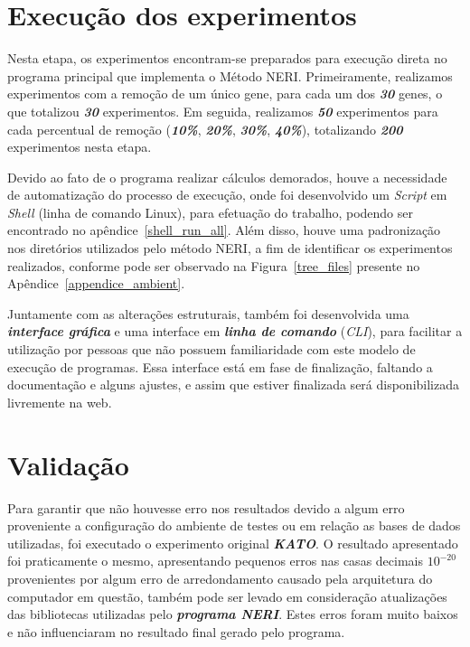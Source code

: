 \section{Execução dos experimentos}

%
% 
Nesta etapa, os experimentos encontram-se preparados para execução direta no programa principal que implementa o Método NERI.
%
Primeiramente, realizamos experimentos com a remoção de um único gene, para cada um dos \textsl{\textbf{30}} genes, o que totalizou \textsl{\textbf{30}} experimentos.
%
Em seguida, realizamos \textsl{\textbf{50}} experimentos para cada percentual de remoção (\textsl{\textbf{10\%}}, \textsl{\textbf{20\%}}, \textsl{\textbf{30\%}}, \textsl{\textbf{40\%}}), totalizando \textsl{\textbf{200}} experimentos nesta etapa.

%
Devido ao fato de o programa realizar cálculos demorados, houve a necessidade de automatização do processo de execução, onde foi desenvolvido um \textsl{Script} em \textsl{Shell} (linha de comando Linux), para efetuação do trabalho, podendo ser encontrado no apêndice~\ref{shell_run_all}.
Além disso, houve uma padronização nos diretórios utilizados pelo método NERI, a fim de identificar os experimentos realizados, conforme pode ser observado na Figura~\ref{tree_files} presente no Apêndice~\ref{appendice_ambient}.

%
Juntamente com as alterações estruturais, também foi desenvolvida uma \textsl{\textbf{interface gráfica}} e uma interface em \textsl{\textbf{linha de comando}} (\textsl{CLI}), para facilitar a utilização por pessoas que não possuem familiaridade com este modelo de execução de programas.
Essa interface está em fase de finalização, faltando a documentação e alguns ajustes, e assim que estiver finalizada será disponibilizada livremente na web.

\section{Validação}
%
Para garantir que não houvesse erro nos resultados devido a algum erro proveniente a configuração do ambiente de testes ou em relação as bases de dados utilizadas, foi executado o experimento original \textsl{\textbf{KATO}}. O resultado apresentado foi praticamente o mesmo, apresentando pequenos erros nas casas decimais \textsl{\textbf{$10^{-20}$}} provenientes por algum erro de arredondamento causado pela arquitetura do computador em questão, também pode ser levado em consideração atualizações das bibliotecas utilizadas pelo \textsl{\textbf{programa NERI}}. Estes erros foram muito baixos e não influenciaram no resultado final gerado pelo programa. %

